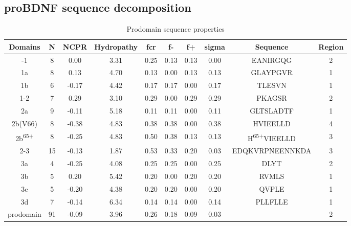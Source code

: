 \documentclass[journal=jacsat,manuscript=article]{achemso}
\begin{document}
\subsection{proBDNF sequence decomposition} 



\begin{table}[htp]
\caption{Prodomain sequence properties}
\begin{center}
\begin{tabular}{|c|c|c|c|c|c|c|c|c|c|}
\hline
Domains  &  N & NCPR  & Hydropathy  & fcr  & f- & f+ & sigma  & Sequence & Region\\
\hline\hline


-1 & 8 & 0.00 & 3.31 & 0.25 & 0.13 & 0.13 & 0.00 &  EANIRGQG & 2\\
\hline
1a & 8 & 0.13 & 4.70 & 0.13 & 0.00 & 0.13 & 0.13 &  GLAYPGVR & 1\\
\hline
1b & 6 & -0.17 & 4.42 & 0.17 & 0.17 & 0.00 & 0.17 &  TLESVN & 1\\
\hline
1-2 & 7 & 0.29 & 3.10 & 0.29 & 0.00 & 0.29 & 0.29 &  PKAGSR & 2\\
\hline
2a & 9 & -0.11 & 5.18 & 0.11 & 0.11 & 0.00 & 0.11 & GLTSLADTF & 1\\
\hline
2b(V66) & 8 & -0.38 & 4.83 & 0.38 & 0.38 & 0.00 & 0.38 &  HVIEELLD & 4\\
\hline
2b\textsuperscript{65+}	&8	& -0.25&	4.83&	0.50&	0.38	&0.13	&0.13	&H\textsuperscript{65+}VIEELLD	&3\\
\hline
2-3 & 15 & -0.13 & 1.87 & 0.53 & 0.33 & 0.20 & 0.03 & EDQKVRPNEENNKDA & 3\\
\hline
3a & 4 & -0.25 & 4.08 & 0.25 & 0.25 & 0.00 & 0.25 &  DLYT & 2\\
\hline
3b & 5 & 0.20 & 5.42 & 0.20 & 0.00 & 0.20 & 0.20 &  RVMLS & 1\\
\hline
3c & 5 & -0.20 & 4.38 & 0.20 & 0.20 & 0.00 & 0.20 &  QVPLE & 1\\
\hline
3d & 7 & -0.14 & 6.34 & 0.14 & 0.14 & 0.00 & 0.14 &  PLLFLLE & 1\\
\hline\hline
prodomain & 91 & -0.09 & 3.96 & 0.26 & 0.18 & 0.09 & 0.03 & & 2\\
\hline
\end{tabular}
\end{center}
\label{default}
\end{table}%
\end{document}

